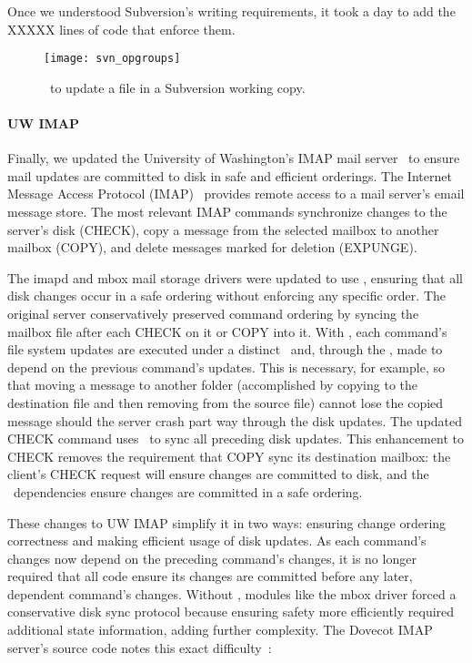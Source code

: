 Once we understood Subversion's writing requirements, it took a day to add
the XXXXX lines of code that enforce them.

\begin{figure}[t]
  \centering
  \texttt{[image: svn\_opgroups]}
  \caption{\Opgroups\ to update a file in a Subversion working copy.}
  \label{fig:svn-order}
\end{figure}

\paragraph{UW IMAP}
\label{sec:opgroup:uwimap}

Finally, we updated the University of Washington's IMAP mail server~\cite{uwimap} to
ensure mail updates are committed to disk
in safe and efficient orderings.
%
The Internet Message Access Protocol (IMAP)~\cite{rfc3501} provides
remote access to a mail server's email message store.
%
The most relevant IMAP commands synchronize changes to the server's
disk (CHECK), copy a message from the selected mailbox to another
mailbox (COPY), and delete messages marked for deletion (EXPUNGE).

The imapd and mbox mail storage
drivers were updated to use \opgroups, ensuring that all disk changes occur in a safe
ordering without enforcing any specific order.
%
The original server conservatively preserved command ordering by
syncing the mailbox file after each CHECK on it or COPY into it. With
\opgroups, each command's file system updates are executed under a
distinct \opgroup\ and, through the \opgroup, made to depend on the
previous command's updates. This is necessary, for example, so that
moving a message to another folder (accomplished by copying to the
destination file and then removing from the source file) cannot lose
the copied message should the server crash part way through the disk
updates.
%
The updated CHECK command uses \pgSync\ to sync all preceding disk
updates. This enhancement to CHECK removes the requirement that COPY
sync its destination mailbox: the client's CHECK request will ensure
changes are committed to disk, and the \opgroup\ dependencies ensure
changes are committed in a safe ordering.

These changes to UW IMAP simplify it in two ways:
%
ensuring change ordering correctness
%
and making efficient usage of disk updates.
%
As each command's changes now depend on the preceding command's
changes, it is no longer required that all code
ensure its changes are committed before any later, dependent
command's changes. Without \opgroups, modules like the mbox driver
forced a conservative disk sync protocol because ensuring safety more
efficiently required additional state information, adding further
complexity. The Dovecot IMAP server's source code notes this exact
difficulty~\cite[maildir-save.c]{dovecot}:

